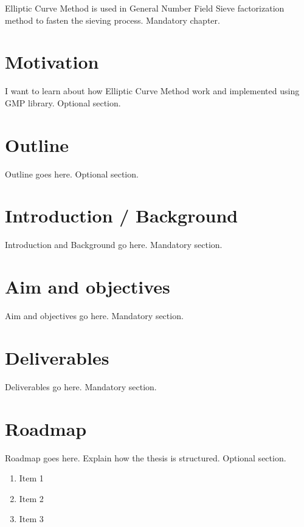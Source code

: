 Elliptic Curve Method is used in General Number Field Sieve factorization method
to fasten the sieving process.
 Mandatory chapter.

\section{Motivation}
I want to learn about how Elliptic Curve Method work and implemented using GMP
library.
Optional section.

\section{Outline}
Outline goes here.
Optional section.

\section{Introduction / Background}
Introduction and Background go here.
Mandatory section. 
 
\section{Aim and objectives}
Aim and objectives go here.
Mandatory section.

\section{Deliverables}
Deliverables go here.
Mandatory section.

\section{Roadmap}
Roadmap goes here. Explain how the thesis is structured.
Optional section.

\begin{enumerate}   
	\item Item 1
	\item Item 2
	\item Item 3
\end{enumerate}